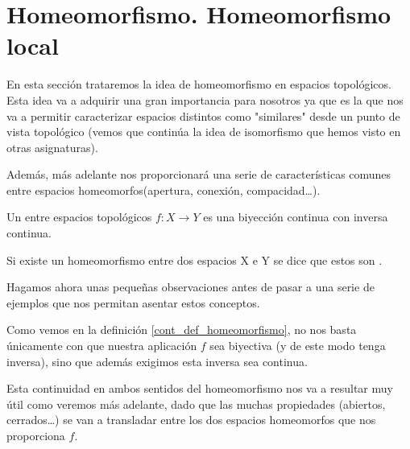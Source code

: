 \section{Homeomorfismo. Homeomorfismo local}
\label{cont_homeomorfismos}
En esta sección trataremos la idea de homeomorfismo en espacios topológicos. Esta idea va a adquirir una gran importancia para nosotros ya que es la que nos va a permitir caracterizar espacios distintos como "similares" desde un punto de vista topológico (vemos que continúa la idea de isomorfismo que hemos visto en otras asignaturas).


Además, más adelante nos proporcionará una serie de características comunes entre espacios homeomorfos(apertura, conexión, compacidad\dots).

\label{cont_def_homeomorfismo}

\begin{defi}[Homeomorfismo]
	Un  entre espacios topológicos $f\colon X\rightarrow Y$ es una biyección continua con inversa continua.
	
	Si existe un homeomorfismo entre dos espacios X e Y se dice que estos son .
\end{defi}

Hagamos ahora unas pequeñas observaciones antes de pasar a una serie de ejemplos que nos permitan asentar estos conceptos.

\label{cont_obs_defHomeomorfismo}
\begin{obs}
	Como vemos en la definición \ref{cont_def_homeomorfismo}, no nos basta únicamente con que nuestra aplicación $f$ sea biyectiva (y de este modo tenga inversa), sino que además exigimos esta inversa sea continua. 
	
	Esta continuidad en ambos sentidos del homeomorfismo nos va a resultar muy útil como veremos más adelante, dado que las muchas propiedades (abiertos, cerrados\dots) se van a transladar entre los dos espacios homeomorfos que nos proporciona $f$.
\end{obs}

